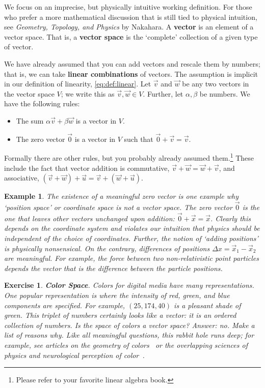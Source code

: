 \documentclass[
  11pt,
	colorful,
	raggedright,
]{tufte-style-thesis-flip}
\newtheorem{exercise}{Exercise}[section]
\newtheorem{example}{Example}[section]
\begin{document}
We focus on an imprecise, but physically intuitive working definition. For those who prefer a more mathematical discussion that is still tied to physical intuition, see \emph{Geometry, Topology, and Physics} by Nakahara. A \textbf{vector} is an element of a vector space. That is, a \textbf{vector space} is the `complete' collection of a given type of vector. 

We have already assumed that you can add vectors and rescale them by numbers; that is, we can take \textbf{linear combinations} of vectors. The assumption is implicit in our definition of linearity, \eqref{eq:def:linear}. Let $\vec{v}$ and $\vec{w}$ be any two vectors in the vector space $V$; we write this as $\vec{v},\vec{w}\in V$. Further, let $\alpha, \beta$ be numbers. We have the following rules:
\begin{itemize}
  \item The sum $\alpha\vec v + \beta\vec w$ is a vector in $V$. 
  \item The zero vector $\vec 0$ is a vector in $V$ such that $\vec 0 + \vec v = \vec v$. 
\end{itemize}
Formally there are other rules, but you probably already assumed them.\footnote{Please refer to your favorite linear algebra book.} These include the fact that vector addition is commutative, $\vec v + \vec w = \vec w + \vec v$, and associative, $(\vec v + \vec w) + \vec u = \vec v + (\vec w + \vec u)$. 
\begin{example}
The existence of a meaningful zero vector is one example why `position space' or coordinate space is not a vector space. The zero vector $\vec 0$ is the one that leaves other vectors unchanged upon addition: $\vec 0 + \vec x = \vec x$. Clearly this depends on the coordinate system and violates our intuition that physics should be independent of the choice of coordinates. Further, the notion of `adding positions' is physically nonsensical. On the contrary, differences of positions $\Delta{x} = \vec{x}_1-\vec{x}_2$ \emph{are} meaningful. For example, the force between two non-relativistic point particles depends the vector that is the difference between the particle positions.
\end{example}

\begin{exercise} \textbf{Color Space}. Colors for digital media have many representations. One popular representation is  where the intensity of red, green, and blue components are specified. For example, $(25,174,40)$ is a pleasant shade of green. This triplet of numbers certainly looks like a vector: it is an ordered collection of numbers. Is the space of  colors a vector space? \emph{Answer: no. Make a list of reasons why.} Like all meaningful questions, this rabbit hole runs deep; for example, see articles on the geometry of colors~ or the overlapping sciences of physics and neurological perception of color~.
\end{exercise}
\end{document}
